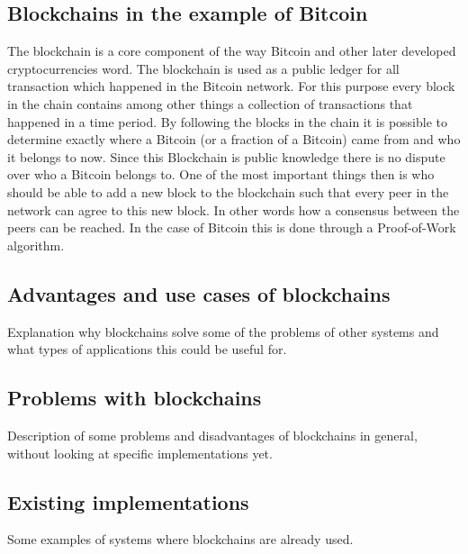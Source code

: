 \subsection{Blockchains in the example of Bitcoin}

The blockchain is a core component of the way Bitcoin and other later developed cryptocurrencies word. The blockchain is used as a public ledger for all transaction which happened in the Bitcoin
network. For this purpose every block in the chain contains among other things a collection of transactions that happened in a time period. By following the blocks in the chain it is possible to
determine exactly where a Bitcoin (or a fraction of a Bitcoin) came from and who it belongs to now. Since this Blockchain is public knowledge there is no dispute over who a Bitcoin belongs to.
One of the most important things then is who should be able to add a new block to the blockchain such that every peer in the network can agree to this new block. In other words how a consensus between
the peers can be reached. In the case of Bitcoin this is done through a Proof-of-Work algorithm.

\subsection{Advantages and use cases of blockchains}

Explanation why blockchains solve some of the problems of other systems and what types of applications this could be useful for.

\subsection{Problems with blockchains}

Description of some problems and disadvantages of blockchains in general, without looking at specific implementations yet.

\subsection{Existing implementations}

Some examples of systems where blockchains are already used.
